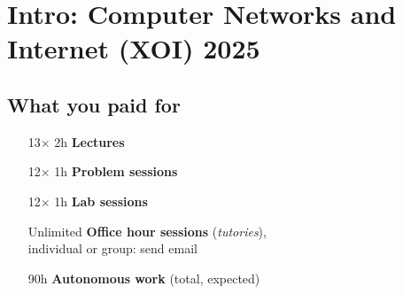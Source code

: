 

\chapter{Intro: Computer Networks and Internet (XOI) 2025}\label{sec:course}

\section*{What you paid for}
\vspace{-0.5cm}
\CellHeight{.5in}
\CellWidth{1in}
\TextSize{\normalsize\centering}
\FiveDay
{}
\begin{schedule}
\end{schedule}

\begin{center}
\begin{minipage}{0.5\linewidth}
\begin{itemize}
 \item[13$\times$] 2h {\color{color1}\textbf{Lectures}}
 \item[12$\times$] 1h {\color{color1}\textbf{Problem sessions}}
 \item[12$\times$] 1h {\color{color2}\textbf{Lab sessions}}
 \item[Unlimited] \textbf{\color{darkgray}Office hour sessions} (\textit{tutories}),\\individual or group: send email
 \item[90h] {\textbf{\color{gray}Autonomous work} (total, expected)}
\end{itemize}
\end{minipage}
\end{center}

